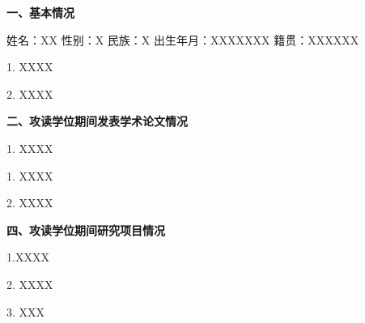 
\newpage\thispagestyle{empty}
\begin{center}{\bfseries\fontsize{18pt}{18pt}\selectfont{}}\end{center}
\vspace{1em}
\begin{raggedright}{\bfseries\fontsize{14pt}{14pt}\selectfont\hei\setlength\parskip{0.5\baselineskip} {一、基本情况}}\end{raggedright}
 
 
姓名：XX  性别：X   民族：X 出生年月：XXXXXXX 籍贯：XXXXXX

1. XXXX

2. XXXX



\begin{raggedright}{\bfseries\fontsize{14pt}{14pt}\selectfont\hei\setlength\parskip{0.5\baselineskip} {二、攻读学位期间发表学术论文情况}}\end{raggedright}

1. XXXX



\begin{raggedright}{\bfseries\fontsize{14pt}{14pt}\selectfont\hei\setlength\parskip{0.5\baselineskip}{三、攻读学位期间获奖情况}}\end{raggedright}

1. XXXX

2. XXXX

\begin{raggedright}{\bfseries\fontsize{14pt}{14pt}\selectfont\hei\setlength\parskip{0.5\baselineskip} {四、攻读学位期间研究项目情况}}\end{raggedright}

1.XXXX

2. XXXX

3. XXX


\clearpage


